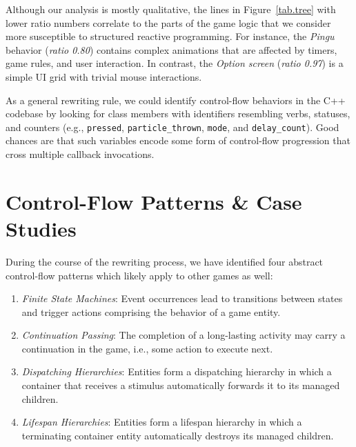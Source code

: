 \documentclass{vgtc}                          %
\newcommand{\code}[1] {{\small{\texttt{#1}}}}
\begin{document}
Although our analysis is mostly qualitative, the lines in Figure~\ref{tab.tree}
with lower ratio numbers correlate to the parts of the game logic that we
consider more susceptible to structured reactive programming.
For instance, the \emph{Pingu} behavior (\emph{ratio 0.80}) contains complex
animations that are affected by timers, game rules, and user interaction.
In contrast, the \emph{Option screen} (\emph{ratio 0.97}) is a simple UI grid
with trivial mouse interactions.

As a general rewriting rule, we could identify control-flow behaviors in the
C++ codebase by looking for class members with identifiers resembling verbs,
statuses, and counters (e.g.,
\code{pressed},
\code{particle\_thrown},
\code{mode}, and
\code{delay\_count}).
Good chances are that such variables encode some form of control-flow
progression that cross multiple callback invocations.

\section{Control-Flow Patterns \& Case Studies}
\label{sec.pats}

During the course of the rewriting process, we have identified four abstract
control-flow patterns which likely apply to other games as well:

\begin{enumerate}
\item \emph{Finite State Machines}:
    Event occurrences lead to transitions between states and trigger actions
    comprising the behavior of a game entity.
\item \emph{Continuation Passing}:
    The completion of a long-lasting activity may carry a continuation in the
    game, i.e., some action to execute next.
\item \emph{Dispatching Hierarchies}:
    Entities form a dispatching hierarchy in which a container that receives a
    stimulus automatically forwards it to its managed children.
\item \emph{Lifespan Hierarchies}:
    Entities form a lifespan hierarchy in which a terminating container entity
    automatically destroys its managed children.
\end{enumerate}
\end{document}
